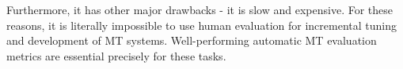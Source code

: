 Furthermore, it has other major drawbacks - it is slow and expensive. For these reasons, it is literally impossible to use human evaluation for incremental tuning and development of MT systems. Well-performing automatic MT evaluation metrics are essential precisely for these tasks. 

 

